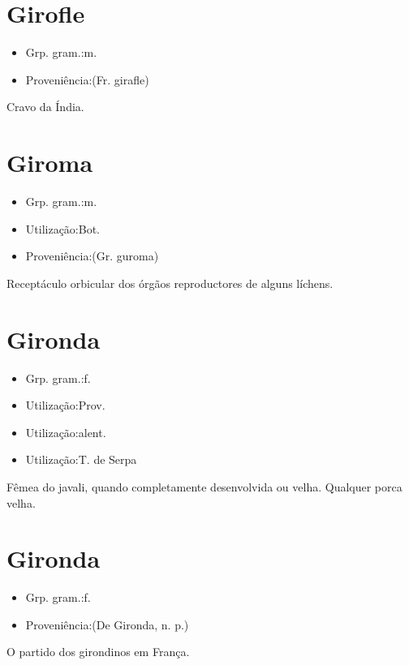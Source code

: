 \section{Girofle}
\begin{itemize}
\item {Grp. gram.:m.}
\end{itemize}
\begin{itemize}
\item {Proveniência:(Fr. \textunderscore girafle\textunderscore )}
\end{itemize}
Cravo da Índia.
\section{Giroma}
\begin{itemize}
\item {Grp. gram.:m.}
\end{itemize}
\begin{itemize}
\item {Utilização:Bot.}
\end{itemize}
\begin{itemize}
\item {Proveniência:(Gr. \textunderscore guroma\textunderscore )}
\end{itemize}
Receptáculo orbicular dos órgãos reproductores de alguns líchens.
\section{Gironda}
\begin{itemize}
\item {Grp. gram.:f.}
\end{itemize}
\begin{itemize}
\item {Utilização:Prov.}
\end{itemize}
\begin{itemize}
\item {Utilização:alent.}
\end{itemize}
\begin{itemize}
\item {Utilização:T. de Serpa}
\end{itemize}
Fêmea do javali, quando completamente desenvolvida ou velha.
Qualquer porca velha.
\section{Gironda}
\begin{itemize}
\item {Grp. gram.:f.}
\end{itemize}
\begin{itemize}
\item {Proveniência:(De \textunderscore Gironda\textunderscore , n. p.)}
\end{itemize}
O partido dos girondinos em França.
